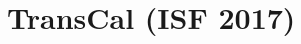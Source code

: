 \documentclass[11pt]{article}
\begin{document}
\section*{TransCal (ISF 2017)}









\end{document}
